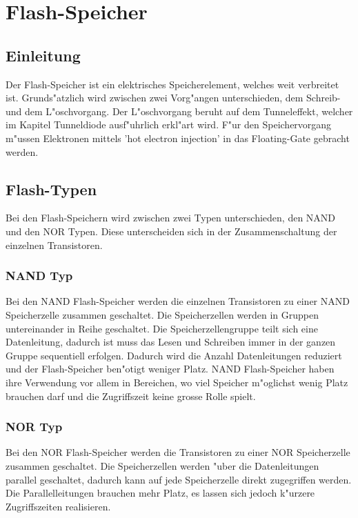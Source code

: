 \chapter{Flash-Speicher\label{chapter:flash}}
\begin{refsection}

\newpage
\section{Einleitung}
Der Flash-Speicher ist ein elektrisches Speicherelement, welches weit verbreitet ist. Grunds"atzlich wird zwischen zwei Vorg"angen unterschieden, dem Schreib- und dem L"oschvorgang. Der L"oschvorgang beruht auf dem Tunneleffekt, welcher im Kapitel Tunneldiode ausf"uhrlich erkl"art wird. F"ur den Speichervorgang m"ussen Elektronen mittels 'hot electron injection' in das Floating-Gate gebracht werden. 

\section{Flash-Typen}
Bei den Flash-Speichern wird zwischen zwei Typen unterschieden, den NAND und den NOR Typen. Diese unterscheiden sich in der Zusammenschaltung der einzelnen Transistoren. 

\subsection{NAND Typ}
Bei den NAND Flash-Speicher werden die einzelnen Transistoren zu einer NAND Speicherzelle zusammen geschaltet. 
Die Speicherzellen werden in Gruppen untereinander in Reihe geschaltet. Die Speicherzellengruppe teilt sich eine Datenleitung, dadurch ist muss das Lesen und Schreiben immer in der ganzen Gruppe sequentiell erfolgen. Dadurch wird die Anzahl Datenleitungen reduziert und der Flash-Speicher ben"otigt weniger Platz. NAND Flash-Speicher haben ihre Verwendung vor allem in Bereichen, wo viel Speicher m"oglichst wenig Platz brauchen darf und die Zugriffszeit keine grosse Rolle spielt.
\subsection{NOR Typ}
Bei den NOR Flash-Speicher werden die Transistoren zu einer NOR Speicherzelle zusammen geschaltet.
Die Speicherzellen werden "uber die Datenleitungen parallel geschaltet, dadurch kann auf jede Speicherzelle direkt zugegriffen werden. Die Parallelleitungen brauchen mehr Platz, es lassen sich jedoch k"urzere Zugriffszeiten realisieren.


\end{refsection}
